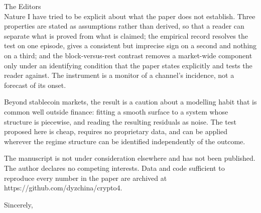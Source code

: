 \documentclass[11pt]{letter}
\begin{document}
\begin{letter}{The Editors\\Nature}
I have tried to be explicit about what the paper does not establish. Three properties are stated as assumptions rather than derived, so that a reader can separate what is proved from what is claimed; the empirical record resolves the test on one episode, gives a consistent but imprecise sign on a second and nothing on a third; and the block-versus-rest contrast removes a market-wide component only under an identifying condition that the paper states explicitly and tests the reader against. The instrument is a monitor of a channel's incidence, not a forecast of its onset.

Beyond stablecoin markets, the result is a caution about a modelling habit that is common well outside finance: fitting a smooth surface to a system whose structure is piecewise, and reading the resulting residuals as noise. The test proposed here is cheap, requires no proprietary data, and can be applied wherever the regime structure can be identified independently of the outcome.

The manuscript is not under consideration elsewhere and has not been published. The author declares no competing interests. Data and code sufficient to reproduce every number in the paper are archived at https://github.com/dyzchina/crypto4.

\closing{Sincerely,}
\end{letter}
\end{document}
